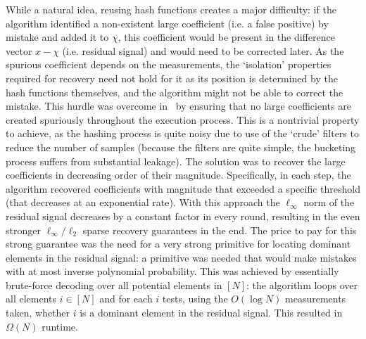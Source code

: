  While a natural idea, reusing hash functions creates a major difficulty: if the algorithm identified a non-existent large coefficient (i.e. a false positive) by mistake and added it to $\chi$, this coefficient would be present in the difference vector $x - \chi$ (i.e. residual signal) and would need to be corrected later. As the spurious coefficient depends on the measurements, the `isolation' properties required for recovery need not hold for it as its position is determined by the hash functions themselves, and the algorithm might not be able to correct the mistake.  This hurdle was overcome in~\cite{IK14a} by ensuring that no large coefficients are created spuriously throughout the execution process. This is a nontrivial property to achieve, as the hashing process is quite noisy due to use of the `crude' filters to reduce the number of samples (because the filters are quite simple, the bucketing process suffers from substantial leakage). The solution was to recover the large coefficients in decreasing order of their magnitude. Specifically, in each step, the algorithm recovered coefficients with magnitude that exceeded a specific threshold (that decreases at an exponential rate). With this approach the $\ell_\infty$ norm of the residual signal decreases by a constant factor in every round, resulting in the even stronger $\ell_\infty/\ell_2$ sparse recovery guarantees in the end. The price to pay for this strong guarantee was the need for a very strong primitive for locating dominant elements in the residual signal: a primitive was needed that would make mistakes with at most inverse polynomial probability. This was achieved by essentially brute-force decoding over all potential elements in $[N]$: the algorithm loops over all elements $i\in [N]$ and for each $i$ tests, using the $O(\log N)$ measurements taken, whether $i$ is a dominant element in the residual signal. This resulted in $\Omega(N)$ runtime.


